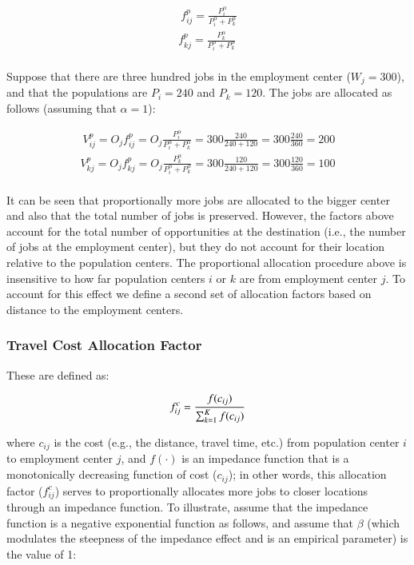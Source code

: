 \documentclass[]{elsarticle} %
\begin{document}
\[
\begin{array}{l}\
f^p_{ij} = \frac{P_i ^\alpha}{P_i^\alpha + P_k^\alpha}\\
f^p_{kj} = \frac{P_k^\alpha}{P_i^\alpha + P_k^\alpha}\\
\end{array}
\]

Suppose that there are three hundred jobs in the employment center
(\(W_j = 300\)), and that the populations are \(P_i=240\) and
\(P_k=120\). The jobs are allocated as follows (assuming that
\(\alpha=1\)):

\[
\begin{array}{l}\
V^p_{ij} = O_jf^p_{ij} = O_j\frac{P_i^\alpha}{P_i^\alpha + P_k^\alpha} = 300\frac{240}{240 + 120} = 300\frac{240}{360} = 200\\
V^p_{kj} = O_jf^p_{kj} = O_j\frac{P_k^\alpha}{P_i^\alpha + P_k^\alpha} = 300\frac{120}{240 + 120} = 300\frac{120}{360} = 100 \\
\end{array}
\]

It can be seen that proportionally more jobs are allocated to the bigger
center and also that the total number of jobs is preserved. However, the
factors above account for the total number of opportunities at the
destination (i.e., the number of jobs at the employment center), but
they do not account for their location relative to the population
centers. The proportional allocation procedure above is insensitive to
how far population centers \(i\) or \(k\) are from employment center
\(j\). To account for this effect we define a second set of allocation
factors based on distance to the employment centers.

\hypertarget{travel-cost-allocation-factor}{%
\subsubsection{Travel Cost Allocation
Factor}\label{travel-cost-allocation-factor}}

These are defined as:

\[
f^c_{ij} = \frac{f(c_{ij})}{\sum_{k=1}^K f(c_{ij})}\\
\]

\noindent where \(c_{ij}\) is the cost (e.g., the distance, travel time,
etc.) from population center \(i\) to employment center \(j\), and
\(f(\cdot)\) is an impedance function that is a monotonically decreasing
function of cost (\(c_{ij}\)); in other words, this allocation factor
(\(f^c_{ij}\)) serves to proportionally allocates more jobs to closer
locations through an impedance function. To illustrate, assume that the
impedance function is a negative exponential function as follows, and
assume that \(\beta\) (which modulates the steepness of the impedance
effect and is an empirical parameter) is the value of 1:
\end{document}
